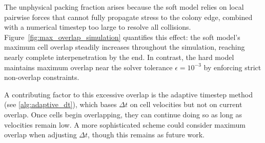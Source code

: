 \documentclass[conference]{IEEEtran}
\begin{document}
The unphysical packing fraction arises because the soft model relies on local pairwise forces that cannot fully propagate stress to the colony edge, combined with a numerical timestep too large to resolve all collisions. Figure~\ref{fig:max_overlap_simulation} quantifies this effect: the soft model's maximum cell overlap steadily increases throughout the simulation, reaching nearly complete interpenetration by the end. In contrast, the hard model maintains maximum overlap near the solver tolerance $\epsilon = 10^{-3}$ by enforcing strict non-overlap constraints.

A contributing factor to this excessive overlap is the adaptive timestep method (see \autoref{alg:adaptive_dt}), which bases $\Delta t$ on cell velocities but not on current overlap. Once cells begin overlapping, they can continue doing so as long as velocities remain low. A more sophisticated scheme could consider maximum overlap when adjusting $\Delta t$, though this remains as future work.
\end{document}
